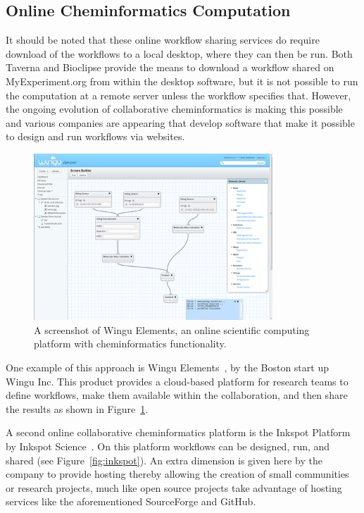 \documentclass[11pt]{book}
\begin{document}
\subsection{Online Cheminformatics Computation}

It should be noted that these online workflow sharing services do
require download of the workflows to a local desktop, where
they can then be run. Both Taverna and Bioclipse provide
the means to download a workflow shared on MyExperiment.org from
within the desktop software, but it is not possible
to run the computation at a remote server unless the workflow
specifies that.
However, the ongoing evolution of collaborative cheminformatics
is making this possible and various companies are appearing that
develop software that make
it possible to design and run workflows via websites.

\begin{figure}[bt]
\begin{center}
\includegraphics[width=0.8\textwidth]{graphics/wingu.png}
\end{center}
\caption{A screenshot of Wingu Elements, an online scientific
computing platform with cheminformatics functionality.}
\label{fig:wingu}
\end{figure}

One example of this approach is Wingu Elements~\cite{wingu}, by the Boston start up
Wingu Inc. This product provides a cloud-based platform for research teams
to define workflows, make them available within the collaboration, and
then share the results as shown in Figure~\ref{fig:wingu}.

A second online collaborative cheminformatics platform is the
Inkspot Platform by Inkspot Science~\cite{inkspot}. On this platform
workflows can be designed, run, and shared (see
Figure~\ref{fig:inkspot}). An extra dimension
is given here by the company to provide hosting thereby allowing the creation
of small communities or research projects, much like open source
projects take advantage of hosting services like the aforementioned
SourceForge and GitHub.
\end{document}
